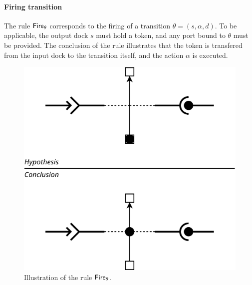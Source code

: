 \paragraph{Firing transition}{

The rule $\mathsf{Fire}_\theta$ corresponds to the firing of a transition
$\theta = (s, \alpha, d)$. To be applicable, the output dock $s$ must
hold a token, and any port bound to $\theta$ must be provided. The
conclusion of the rule illustrates that the token is transfered from
the input dock to the transition itself, and the action $\alpha$ is
executed.

\begin{figure}[t]
\begin{center}
  \includegraphics[width=0.55\columnwidth]{./images/firing.pdf}
\end{center}
\caption{Illustration of the rule $\mathsf{Fire}_\theta$.}
\label{fig:r1}
\end{figure}

}

